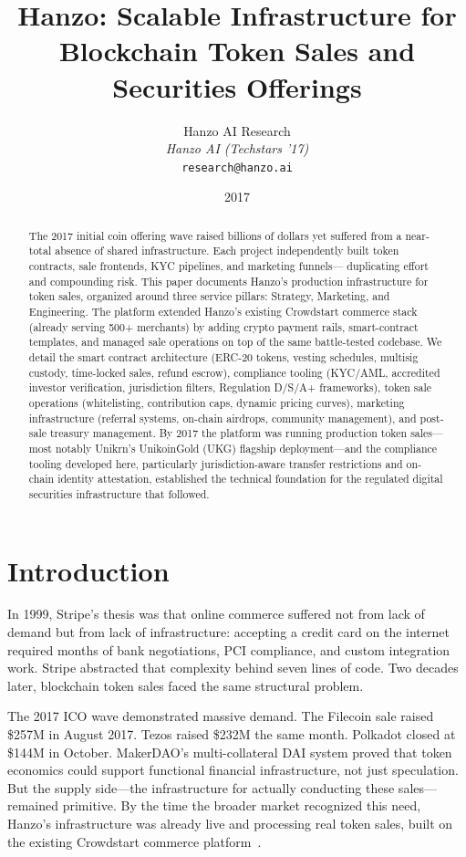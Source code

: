 \documentclass[11pt,letterpaper]{article}
\title{Hanzo: Scalable Infrastructure for Blockchain Token Sales
and Securities Offerings}
\author{
    Hanzo AI Research \\
    \textit{Hanzo AI (Techstars '17)} \\
    \texttt{research@hanzo.ai}
}
\date{2017}
\begin{document}
\hanzocoverpage

\maketitle

\begin{abstract}
The 2017 initial coin offering wave raised billions of dollars yet suffered
from a near-total absence of shared infrastructure. Each project independently
built token contracts, sale frontends, KYC pipelines, and marketing funnels---
duplicating effort and compounding risk. This paper documents Hanzo's
production infrastructure for token sales, organized around three service
pillars: Strategy, Marketing, and Engineering. The platform extended Hanzo's
existing Crowdstart commerce stack~\cite{crowdstart2014} (already serving
500+ merchants) by adding crypto payment rails, smart-contract templates, and
managed sale operations on top of the same battle-tested codebase. We detail
the smart contract architecture (ERC-20 tokens, vesting schedules, multisig
custody, time-locked sales, refund escrow), compliance tooling (KYC/AML,
accredited investor verification, jurisdiction filters, Regulation D/S/A+
frameworks), token sale operations (whitelisting, contribution caps, dynamic
pricing curves), marketing infrastructure (referral systems, on-chain
airdrops, community management), and post-sale treasury management. By 2017
the platform was running production token sales---most notably Unikrn's
UnikoinGold (UKG) flagship deployment---and the compliance tooling developed
here, particularly jurisdiction-aware transfer restrictions and on-chain
identity attestation, established the technical foundation for the regulated
digital securities infrastructure that followed.
\end{abstract}

\section{Introduction}
\label{sec:intro}

In 1999, Stripe's thesis was that online commerce suffered not from lack of
demand but from lack of infrastructure: accepting a credit card on the internet
required months of bank negotiations, PCI compliance, and custom integration
work. Stripe abstracted that complexity behind seven lines of code. Two decades
later, blockchain token sales faced the same structural problem.

The 2017 ICO wave demonstrated massive demand. The Filecoin sale raised
\$257M in August 2017. Tezos raised \$232M the same month. Polkadot closed at
\$144M in October. MakerDAO's multi-collateral DAI system proved that token
economics could support functional financial infrastructure, not just
speculation. But the supply side---the infrastructure for actually conducting
these sales---remained primitive. By the time the broader market recognized
this need, Hanzo's infrastructure was already live and processing real token
sales, built on the existing Crowdstart commerce platform~\cite{crowdstart2014}.
\end{document}
